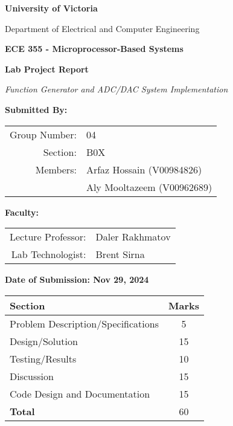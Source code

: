 \begin{titlepage}
\begin{center}

{\Large\bfseries University of Victoria \par}
{\large Department of Electrical and Computer Engineering \par}
\vspace{1cm}

{\large\bfseries ECE 355 - Microprocessor-Based Systems \par}
\vspace{1cm}

{\Huge\bfseries Lab Project Report \par}
\vspace{0.5cm}
{\large\textit{Function Generator and ADC/DAC System Implementation} \par}
\vspace{1.5cm}

{\large\bfseries Submitted By: \par}
\vspace{0.5cm}
\begin{tabular}{rl}
Group Number: & 04 \\
Section: & B0X \\
Members: & Arfaz Hossain (V00984826) \\
         & Aly Mooltazeem (V00962689) \\
\end{tabular}
\vspace{1cm}

{\large\bfseries Faculty: \par}
\vspace{0.5cm}
\begin{tabular}{rl}
Lecture Professor: & Daler Rakhmatov \\
Lab Technologist: & Brent Sirna \\
\end{tabular}
\vspace{1cm}

{\large\bfseries Date of Submission: Nov 29, 2024 \par}

\vfill

\begin{center}
\begin{tabular}{|l|c|}
\hline
\textbf{Section} & \textbf{Marks} \\
\hline
Problem Description/Specifications & 5 \\
Design/Solution & 15 \\
Testing/Results & 10 \\
Discussion & 15 \\
Code Design and Documentation & 15 \\
\hline
\textbf{Total} & 60 \\
\hline
\end{tabular}
\end{center}

\end{center}
\end{titlepage}
